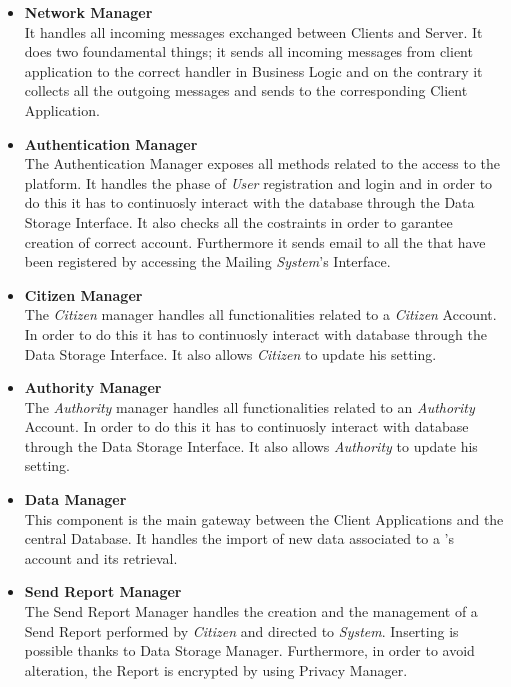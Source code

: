 \documentclass{article}
\begin{document}
\begin{itemize}
    \item \textbf{Network Manager} \\
    It handles all incoming messages exchanged between Clients and Server. It does two foundamental
    things; it sends all incoming messages from client application to the correct handler in Business
    Logic and on the contrary it collects all the outgoing messages and sends to the corresponding Client
    Application.
    \item \textbf{Authentication Manager} \\
    The Authentication Manager exposes all methods related to the access to the platform. It handles the
    phase of \textit{User} registration and login and in order to do this it has to continuosly interact with 
    the database through the Data Storage Interface. It also checks all the costraints in order to garantee 
    creation of correct account. Furthermore it sends email to all the  that have been registered 
    by accessing the Mailing \textit{System}'s Interface. 
    \item \textbf{Citizen Manager} \\
    The \textit{Citizen} manager handles all functionalities related to a \textit{Citizen} Account. In order to
    do this it has to continuosly interact with database through the Data Storage Interface. It also allows
    \textit{Citizen} to update his setting. 
    \item \textbf{Authority Manager} \\
    The \textit{Authority} manager handles all functionalities related to an \textit{Authority} Account. In order to
    do this it has to continuosly interact with database through the Data Storage Interface. It also allows
    \textit{Authority} to update his setting.
    \item \textbf{Data Manager} \\
    This component is the main gateway between the Client Applications and the central Database. It handles the import of 
    new data associated to a 's account and its retrieval.
    \item \textbf{Send Report Manager}\\
    The Send Report Manager handles the creation and the management of a Send Report performed by \textit{Citizen} and
    directed to \textit{System}. Inserting is possible thanks to Data Storage Manager. Furthermore, in order to avoid 
    alteration, the Report is encrypted by using Privacy Manager.

\end{itemize}
\end{document}
